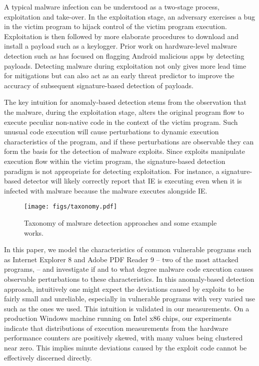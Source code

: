 \documentclass{acm_proc_article-sp}
\begin{document}
A typical malware infection can be understood as a two-stage process,
exploitation and take-over. In the exploitation stage, an adversary
exercises a bug in the victim program to hijack control of the
victim program execution. Exploitation is then followed by more
elaborate procedures to download and install a payload such as a
keylogger.  Prior work on hardware-level malware detection such as \cite{Demme:2013:FOM:2485922.2485970} has focused on flagging Android malicious apps by detecting payloads. 
Detecting malware during exploitation
not only gives more lead time for mitigations but can also act as
an early threat predictor to improve the accuracy of subsequent
signature-based detection of payloads.

The key intuition for anomaly-based detection stems from the
observation that the malware, during the exploitation stage, alters
the original program flow to execute peculiar non-native code in
the context of the victim program. Such unusual code execution will
cause perturbations to dynamic execution characteristics of the
program, and if these perturbations are observable they can form
the basis for the detection of malware exploits. Since exploits
manipulate execution flow within the victim program, the signature-based
detection paradigm is not appropriate for detecting exploitation.
For instance, a signature-based detector will likely correctly
report that IE is executing even when it is infected with malware
because the malware executes alongside IE.

\begin{figure}
  \centering
  \texttt{[image: figs/taxonomy.pdf]}
  \caption{Taxonomy of malware detection approaches and some example works.}
  \label{fig:taxonomy}
\end{figure}

\nocite{szor2005art, polychronakis2007emulation, polychronakis2010comprehensive, kayaalp2013scrap, Wang:2013:NDK:2463209.2488831}


In this paper, we model the characteristics of common vulnerable
programs such as Internet Explorer 8 and Adobe PDF Reader 9 -- two
of the most attacked programs, -- and investigate if and to what
degree malware code execution causes observable perturbations to
these characteristics.  In this anomaly-based detection approach,
intuitively one might expect the deviations caused by exploits to
be fairly small and unreliable, especially in vulnerable programs
with very varied use such as the ones we used. This intuition is
validated in our measurements. On a production Windows machine
running on Intel x86 chips, our experiments indicate that distributions
of execution measurements from the hardware performance counters
are positively skewed, with many values being clustered near zero.
This implies minute deviations caused by the exploit code cannot
be effectively discerned directly.
\end{document}
